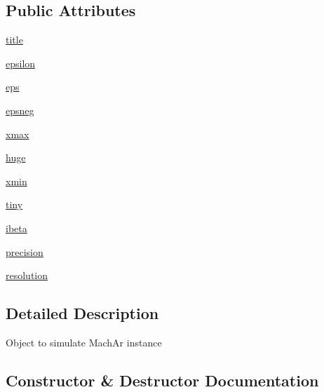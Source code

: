 \subsection*{Public Attributes}
\begin{DoxyCompactItemize}
\item 
\hyperlink{classnumpy_1_1core_1_1getlimits_1_1MachArLike_a9f06060f0777b860aae5d5c6c31a3327}{title}
\item 
\hyperlink{classnumpy_1_1core_1_1getlimits_1_1MachArLike_a0a2ed9af5466ff4385205f79310da9f5}{epsilon}
\item 
\hyperlink{classnumpy_1_1core_1_1getlimits_1_1MachArLike_a4423c6f6e6fc5f254279685f035d827b}{eps}
\item 
\hyperlink{classnumpy_1_1core_1_1getlimits_1_1MachArLike_af3258cec2da5b4e01d86fc675084c14d}{epsneg}
\item 
\hyperlink{classnumpy_1_1core_1_1getlimits_1_1MachArLike_ac25d56b0ddd7a5462facfdd349d56a34}{xmax}
\item 
\hyperlink{classnumpy_1_1core_1_1getlimits_1_1MachArLike_a5a24980acc1255be93a195955ca9c1c4}{huge}
\item 
\hyperlink{classnumpy_1_1core_1_1getlimits_1_1MachArLike_afacf1f3753d936c45b3bc47f38929eab}{xmin}
\item 
\hyperlink{classnumpy_1_1core_1_1getlimits_1_1MachArLike_adeb490f514da6510a0c05fd292618d58}{tiny}
\item 
\hyperlink{classnumpy_1_1core_1_1getlimits_1_1MachArLike_ac4ecd5068e1341ad1d6d673206108385}{ibeta}
\item 
\hyperlink{classnumpy_1_1core_1_1getlimits_1_1MachArLike_aabf7a674722953000b2845457b02e795}{precision}
\item 
\hyperlink{classnumpy_1_1core_1_1getlimits_1_1MachArLike_ad3771911ea8d9b6517d41d45c520c36e}{resolution}
\end{DoxyCompactItemize}


\subsection{Detailed Description}
\begin{DoxyVerb}Object to simulate MachAr instance \end{DoxyVerb}
 

\subsection{Constructor \& Destructor Documentation}
\mbox{\label{classnumpy_1_1core_1_1getlimits_1_1MachArLike_a062b5d5d438a0584a2af12d13b1224af}} 
